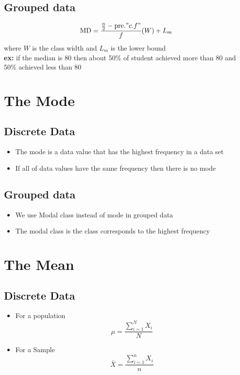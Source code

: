 \documentclass[11pt, a4paper]{article}
\begin{document}
     \subsection{Grouped data}
     $$\text{MD} = \frac{\frac{n}{2} - \text{pre.}"c.f"}{f}(W)+L_m$$
     where $W$ is the class width and $L_m$ is the lower bound \\
     \textbf{ex:} if the median is 80 then about 50\% of student achieved more than 80 and 50\% achieved less than 80 

     \section{The Mode}
     \subsection{Discrete Data}
     \begin{itemize}
        \item The mode is a data value that has the highest frequency in a data set
        \item If all of data values have the same frequency then there is no mode
          
     \end{itemize}
     \subsection{Grouped data}
     \begin{itemize}
         \item We use Modal class instead of mode in grouped data 
         \item The modal class is the class corresponds to the highest frequency
     \end{itemize}


     \section{The Mean}
     \subsection{Discrete Data}
     \begin{itemize}
         \item For a population
         $$\mu = \frac{\sum_{i = 1}^{N} X_i}{N}$$
         \item For a Sample
         $$\bar{X} = \frac{\sum_{i = 1}^{n} X_i}{n}$$
     \end{itemize}
\end{document}
